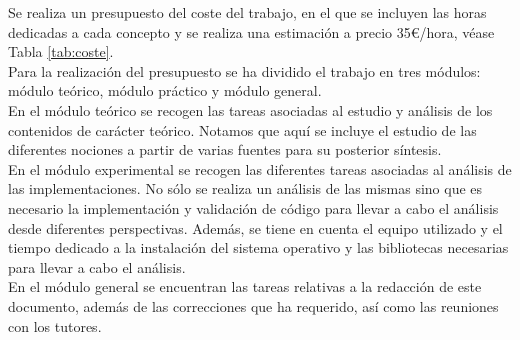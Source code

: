 \documentclass[12pt,a4paper]{report} %
\theoremstyle{definition}
\begin{document}
Se realiza un presupuesto del coste del trabajo, en el que se incluyen las horas dedicadas a cada concepto y se realiza una estimación a precio 35€/hora, véase Tabla \ref{tab:coste}.\\

Para la realización del presupuesto se ha dividido el trabajo en tres módulos: módulo teórico, módulo práctico y módulo general.\\

En el módulo teórico se recogen las tareas asociadas al estudio y análisis de los contenidos de carácter teórico. Notamos que aquí se incluye el estudio de las diferentes nociones a partir de varias fuentes para su posterior síntesis.\\

En el módulo experimental se recogen las diferentes tareas asociadas al análisis de las implementaciones. No sólo se realiza un análisis de las mismas sino que es necesario la implementación y validación de código para llevar a cabo el análisis desde diferentes perspectivas. Además, se tiene en cuenta el equipo utilizado y el tiempo dedicado a la instalación del sistema operativo y las bibliotecas necesarias para llevar a cabo el análisis.\\

En el módulo general se encuentran las tareas relativas a la redacción de este documento, además de las correcciones que ha requerido, así como las reuniones con los tutores.\\
\end{document}
